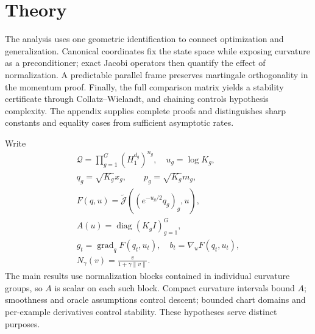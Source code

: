 \section{Theory}
\label{sec:theory}
The analysis uses one geometric identification to connect optimization and generalization. Canonical coordinates fix the state space while exposing curvature as a preconditioner; exact Jacobi operators then quantify the effect of normalization. A predictable parallel frame preserves martingale orthogonality in the momentum proof. Finally, the full comparison matrix yields a stability certificate through Collatz--Wielandt, and chaining controls hypothesis complexity. The appendix supplies complete proofs and distinguishes sharp constants and equality cases from sufficient asymptotic rates.

Write
\begin{gather}
 \mathcal Q=\prod_{g=1}^G(H_1^{d_g})^{n_g},\quad u_g=\log K_g,\\
 q_g=\sqrt{K_g}x_g,\qquad p_g=\sqrt{K_g}m_g,\\
 F(q,u)=\widetilde{\mathcal J}((e^{-u_g/2}q_g)_g,u),\\
 A(u)=\operatorname{diag}(K_gI)_{g=1}^G,\\
 g_t=\operatorname{grad}_qF(q_t,u_t),\quad b_t=\nabla_uF(q_t,u_t),\\
 N_\gamma(v)=\frac{v}{1+\gamma\|v\|}.
\end{gather}
The main results use normalization blocks contained in individual curvature groups, so $A$ is scalar on each such block. Compact curvature intervals bound $A$; smoothness and oracle assumptions control descent; bounded chart domains and per-example derivatives control stability. These hypotheses serve distinct purposes.


